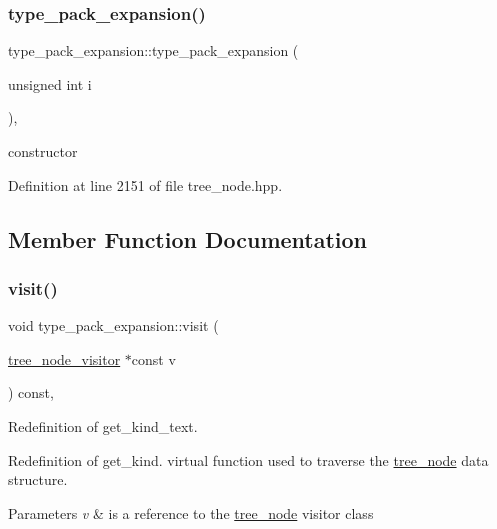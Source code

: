 \subsubsection{\texorpdfstring{type\+\_\+pack\+\_\+expansion()}{type\_pack\_expansion()}}
{\footnotesize\ttfamily type\+\_\+pack\+\_\+expansion\+::type\+\_\+pack\+\_\+expansion (\begin{DoxyParamCaption}\item[{unsigned int}]{i }\end{DoxyParamCaption})\hspace{0.3cm}{\ttfamily [inline]}, {\ttfamily [explicit]}}



constructor 



Definition at line 2151 of file tree\+\_\+node.\+hpp.



\subsection{Member Function Documentation}
\mbox{\label{structtype__pack__expansion_a29598e1fd00fefa43588b8b30c8a6675}} 
\subsubsection{\texorpdfstring{visit()}{visit()}}
{\footnotesize\ttfamily void type\+\_\+pack\+\_\+expansion\+::visit (\begin{DoxyParamCaption}\item[{\hyperlink{classtree__node__visitor}{tree\+\_\+node\+\_\+visitor} $\ast$const}]{v }\end{DoxyParamCaption}) const\hspace{0.3cm}{\ttfamily [override]}, {\ttfamily [virtual]}}



Redefinition of get\+\_\+kind\+\_\+text. 

Redefinition of get\+\_\+kind. virtual function used to traverse the \hyperlink{classtree__node}{tree\+\_\+node} data structure. 
\begin{DoxyParams}{Parameters}
{\em v} & is a reference to the \hyperlink{classtree__node}{tree\+\_\+node} visitor class \\
\hline
\end{DoxyParams}


